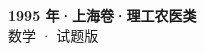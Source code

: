\documentclass[zihao=-4, a4paper]{ctexart}
\begin{document}
\begin{center}
  {\Large\bfseries 1995 年·上海卷·理工农医类}\\[4pt]
  {\large 数学 · 试题版}
\end{center}
\medskip
{}

\end{document}

